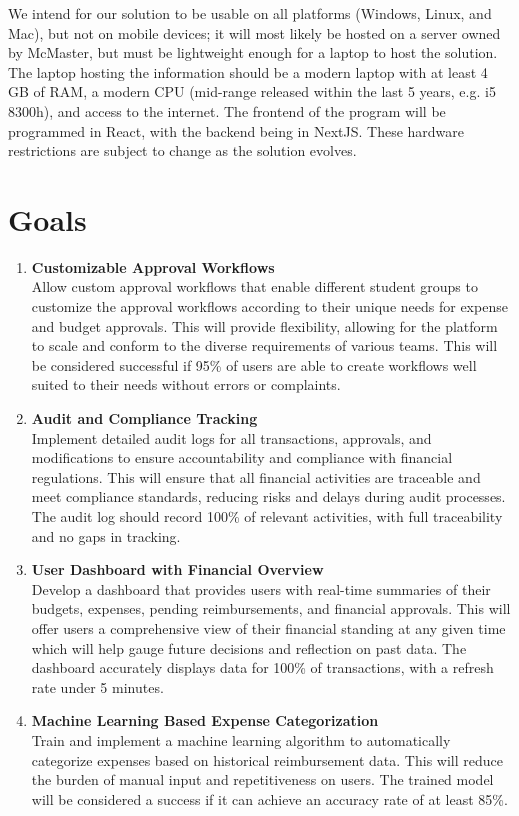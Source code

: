 \documentclass{article}
\begin{document}
\hspace{0.5cm} We intend for our solution to be usable on all platforms (Windows, Linux, and Mac), but not on mobile devices; it will most likely be hosted on a server owned by McMaster, but must be lightweight enough for a laptop to host the solution. The laptop hosting the information should be a modern laptop with at least 4 GB of RAM, a modern CPU (mid-range released within the last 5 years, e.g. i5 8300h), and access to the internet. The frontend of the program will be programmed in React, with the backend being in NextJS. These hardware restrictions are subject to change as the solution evolves.

\section{Goals}

\begin{enumerate}
    \item \textbf{Customizable Approval Workflows} \\
    Allow custom approval workflows that enable different student groups to customize the approval workflows according to their unique needs for expense and budget approvals. This will provide flexibility, allowing for the platform to scale and conform to the diverse requirements of various teams. This will be considered successful if 95\% of users are able to create workflows well suited to their needs without errors or complaints.
    
    \item \textbf{Audit and Compliance Tracking} \\
    Implement detailed audit logs for all transactions, approvals, and modifications to ensure accountability and compliance with financial regulations. This will ensure that all financial activities are traceable and meet compliance standards, reducing risks and delays during audit processes. The audit log should record 100\% of relevant activities, with full traceability and no gaps in tracking.
    
    \item \textbf{User Dashboard with Financial Overview} \\
    Develop a dashboard that provides users with real-time summaries of their budgets, expenses, pending reimbursements, and financial approvals. This will offer users a comprehensive view of their financial standing at any given time which will help gauge future decisions and reflection on past data. The dashboard accurately displays data for 100\% of transactions, with a refresh rate under 5 minutes.
    
    \item \textbf{Machine Learning Based Expense Categorization} \\
    Train and implement a machine learning algorithm to automatically categorize expenses based on historical reimbursement data. This will reduce the burden of manual input and repetitiveness on users. The trained model will be considered a success if it can achieve an accuracy rate of at least 85\%.
\end{enumerate}
\end{document}
